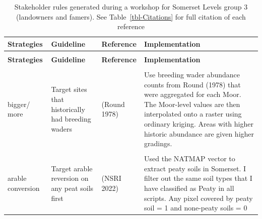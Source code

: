 \documentclass[
  12pt,
  letterpaper,
  DIV=11,
  numbers=noendperiod]{scrartcl}
\begin{document}
\begin{longtable}[t]{>{\raggedright\arraybackslash}p{5em}|>{\raggedright\arraybackslash}p{10em}|>{\raggedright\arraybackslash}p{15em}|>{\raggedright\arraybackslash}p{30em}}

\caption{\label{tbl-SomG3}Stakeholder rules generated during a workshop
for Somerset Levels group 3 (landowners and famers). See
Table~\ref{tbl-Citations} for full citation of each reference}

\tabularnewline

\hline
\begingroup\fontsize{8}{10}\selectfont \textbf{Strategies}\endgroup & \begingroup\fontsize{8}{10}\selectfont \textbf{Guideline}\endgroup & \begingroup\fontsize{8}{10}\selectfont \textbf{Reference}\endgroup & \begingroup\fontsize{8}{10}\selectfont \textbf{Implementation}\endgroup\\
\hline
\endfirsthead
\multicolumn{4}{@{}l}{\textit{(continued)}}\\
\hline
\begingroup\fontsize{8}{10}\selectfont \textbf{Strategies}\endgroup & \begingroup\fontsize{8}{10}\selectfont \textbf{Guideline}\endgroup & \begingroup\fontsize{8}{10}\selectfont \textbf{Reference}\endgroup & \begingroup\fontsize{8}{10}\selectfont \textbf{Implementation}\endgroup\\
\hline
\endhead
\cellcolor{gray!10}{more} & \cellcolor{gray!10}{Target small scattered clusters across landscape under more strategy} & \cellcolor{gray!10}{NA} & \cellcolor{gray!10}{**NOT USED**- We are testing the effects of small vs large clusters in the scenario modelling and can't really include it as spatial grading here.}\\
\hline
bigger/ more & Target sites that historically had breeding waders & (Round 1978) & Use breeding wader abundance counts from Round (1978) that were aggregated for each Moor. The Moor-level values are then interpolated onto a raster using ordinary kriging. Areas with higher historic abundance are given higher gradings.\\
\hline
\cellcolor{gray!10}{arable conversion} & \cellcolor{gray!10}{Target arable conversion on land where maize is grown} & \cellcolor{gray!10}{(UKCEH 2021)} & \cellcolor{gray!10}{All pixels that more than 50\% overlap a maize polygon from the UKCEH landcover plus crops map are assigned a grading of 1 as they will be targeted first for reversion.}\\
\hline
arable conversion & Target arable reversion on any peat soils first & (NSRI 2022) & Used the NATMAP vector to extract peaty soils in Somerset. I filter out the same soil types that I have classified as Peaty in all scripts. Any pixel covered by peaty soil = 1 and none-peaty soils = 0\\

\end{longtable}
\end{document}
